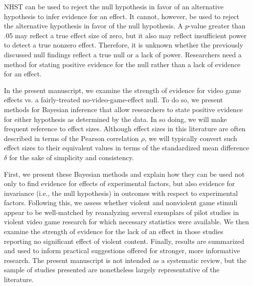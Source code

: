 \documentclass[man]{apa6}
\begin{document}
NHST can be used to reject the null hypothesis in favor of an alternative hypothesis to infer evidence for an effect.  It cannot, however, be used to  reject the alternative hypothesis in favor of the null hypothesis. A $p$-value greater than .05 may reflect a true effect size of zero, but it also may reflect insufficient power to detect a true nonzero effect. Therefore, it is unknown whether the previously discussed null findings reflect a true null or a lack of power.  Researchers need a method for stating positive evidence for the null rather than a lack of evidence for an effect.

In the present manuscript, we examine the strength of evidence for video game effects vs. a fairly-treated no-video-game-effect null.  To do so, we present methods for Bayesian inference that allow researchers to state positive evidence for either hypothesis as determined by the data. In so doing, we will make frequent reference to effect sizes. Although effect sizes in this literature are often described in terms of the Pearson correlation $\rho$, we will typically convert such effect sizes to their equivalent values in terms of the standardized mean difference $\delta$ for the sake of simplicity and consistency.

First, we present these Bayesian methods and explain how they can be used not only to find evidence for effects of experimental factors, but also evidence for invariance (i.e., the null hypothesis) in outcomes with respect to experimental factors. Following this, we assess whether violent and nonviolent game stimuli appear to be well-matched by reanalyzing several exemplars of pilot studies in violent video game research for which necessary statistics were available.  We then examine the strength of evidence for the lack of an effect in those studies reporting no significant effect of violent content.  
Finally, results are summarized and used to inform practical suggestions offered for stronger, more informative research. 
The present manuscript is not intended as a systematic review, but the sample of studies presented are nonetheless largely representative of the literature.
\end{document}
